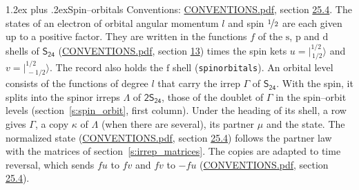 \documentclass[10pt,a4paper]{article}
\makeatletter
\renewcommand\section{\@startsection{section}{1}{\z@}{-3ex plus -1ex minus -.2ex}%
  {1.2ex plus .2ex}{\normalfont\large\sffamily\bfseries\color{parttitle}}}
\numberwithin{equation}{section}
\newcommand{\grp}[1]{\mathsf{#1}}
\newcommand{\orbital}[1]{\mathrm{#1}}
\newcommand{\mult}{\kappa}
\newcommand{\intx}{\mu}
\newcommand{\jm}[2]{\bigl\lvert{}^{#1}_{\,#2}\bigr\rangle}
\makeatother
\begin{document}
\section{Spin--orbitals}\label{s:spin_orbitals}
Conventions: \href{../../CONVENTIONS.pdf}{CONVENTIONS.pdf}, section \href{../../CONVENTIONS.pdf\#conv.25.4}{25.4}.
\leavevmode\label{n:index.orbital.l}The states of an electron of orbital angular momentum $l$ and spin $\nicefrac{1}{2}$ are each given up to a positive factor. \label{n:local.spinor.uv}\label{n:local.function.f}They are written in the functions $f$ of the $\orbital{s}$, $\orbital{p}$ and $\orbital{d}$ shells of \href{../../../rotation/data/pdf/S24.pdf}{$\grp{S_{24}}$} (\href{../../CONVENTIONS.pdf}{CONVENTIONS.pdf}, section \href{../../../rotation/CONVENTIONS.pdf\#conv.13}{13}) times the spin kets $u = \jm{1/2}{1/2}$ and $v = \jm{1/2}{-1/2}$. The record also holds the $\orbital{f}$ shell (\texttt{spinorbitals}). An orbital level consists of the functions of degree $l$ that carry the irrep $\Gamma$ of \href{../../../rotation/data/pdf/S24.pdf}{$\grp{S_{24}}$}. With the spin, it splits into the spinor irreps $\Lambda$ of $\grp{2S_{24}}$, those of the doublet of $\Gamma$ in the spin--orbit levels (section~\ref{s:spin_orbit}, first column). \label{n:head.state}Under the heading of its shell, a row gives $\Gamma$, a copy $\mult$ of $\Lambda$ (when there are several), its partner $\intx$ and the state. The normalized state (\href{../../CONVENTIONS.pdf}{CONVENTIONS.pdf}, section \href{../../CONVENTIONS.pdf\#conv.25.4}{25.4}) follows the partner law with the matrices of section~\ref{s:irrep_matrices}. The copies are adapted to time reversal, which sends $f u$ to $f v$ and $f v$ to $-f u$ (\href{../../CONVENTIONS.pdf}{CONVENTIONS.pdf}, section \href{../../CONVENTIONS.pdf\#conv.25.4}{25.4}).
\end{document}
